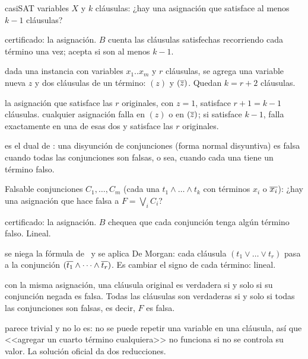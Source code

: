 \begin{problema}{casiSAT}
 variables $X$ y $k$ cláusulas: ¿hay una asignación que satisface al menos $k-1$ cláusulas?

 certificado: la asignación. $B$ cuenta las cláusulas satisfechas recorriendo cada término una vez; acepta si son al menos $k-1$.

 dada una instancia con variables $x_1..x_m$ y $r$ cláusulas, se agrega una variable nueva $z$ y dos cláusulas de un término: $(z)$ y $(\overline{z})$. Quedan $k=r+2$ cláusulas.

 la asignación que satisface las $r$ originales, con $z=1$, satisface $r+1=k-1$ cláusulas.  cualquier asignación falla en $(z)$ o en $(\overline{z})$; si satisface $k-1$, falla exactamente en una de esas dos y satisface las $r$ originales.
\end{problema}

 es el dual de \npSAT: una disyunción de conjunciones (forma normal disyuntiva) es falsa cuando todas las conjunciones son falsas, o sea, cuando cada una tiene un término falso.

\begin{problema}{Falsable}
 conjunciones $C_1,\dots,C_m$ (cada una $t_1\wedge\dots\wedge t_k$ con términos $x_i$ o $\overline{x_i}$): ¿hay una asignación que hace falsa a $F=\bigvee_{i}C_i$?

 certificado: la asignación. $B$ chequea que cada conjunción tenga algún término falso. Lineal.

 se niega la fórmula de \npSAT\ y se aplica De Morgan: cada cláusula $(t_1\vee\dots\vee t_r)$ pasa a la conjunción $(\overline{t_1}\wedge\dots\wedge\overline{t_r})$. Es cambiar el signo de cada término: lineal.

 con la misma asignación, una cláusula original es verdadera si y solo si su conjunción negada es falsa. Todas las cláusulas son verdaderas si y solo si todas las conjunciones son falsas, es decir, $F$ es falsa.
\end{problema}

 parece trivial y no lo es: no se puede repetir una variable en una cláusula, así que <<agregar un cuarto término cualquiera>> no funciona si no se controla su valor. La solución oficial da dos reducciones.

